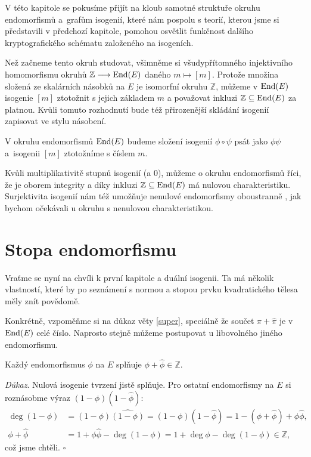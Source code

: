 \documentclass[12pt]{report}
\begin{document}
V této kapitole se pokusíme přijít na kloub samotné struktuře okruhu endomorfismů a~grafům isogenií, které nám pospolu s teorií, kterou jsme si představili v předchozí kapitole, pomohou osvětlit funkčnost dalšího kryptografického schématu založeného na isogeních.

Než začneme tento okruh studovat, všimněme si všudypřítomného injektivního homomorfismu okruhů $\mathbb{Z} \longrightarrow \operatorname{End}(E)$ daného $m \mapsto [m]$. Protože množina složená ze skalárních násobků na $E$ je isomorfní okruhu $\mathbb{Z}$, můžeme v $\operatorname{End}(E)$ isogenie $[m]$ ztotožnit s jejich základem $m$ a považovat inkluzi $\mathbb{Z} \subseteq \operatorname{End}(E)$ za platnou. Kvůli tomuto rozhodnutí bude též přirozenější skládání isogenií zapisovat ve stylu násobení.

\begin{umluva}
V okruhu endomorfismů $\operatorname{End}(E)$ budeme složení isogenií $\phi \circ \psi$ psát jako $\phi \psi$ a~isogenii $[m]$ ztotožníme s číslem $m$.
\end{umluva}


Kvůli multiplikativitě stupnů isogenií (a $0$), můžeme o okruhu endomorfismů říci, že je oborem integrity a díky inkluzi $\mathbb{Z} \subseteq \operatorname{End}(E)$ má nulovou charakteristiku. Surjektivita isogenií nám též umožňuje nenulové endomorfismy oboustranně , jak bychom očekávali u okruhu s nenulovou charakteristikou.

\section{Stopa endomorfismu}

Vraťme se nyní na chvíli k první kapitole a duální isogenii. Ta má několik vlastností, které by po seznámení s normou a stopou prvku kvadratického tělesa měly znít povědomě.

Konkrétně, vzpoměňme si na důkaz věty \ref{super}, speciálně že součet $\pi+\widehat{\pi}$ je v $\operatorname{End}(E)$ celé číslo. Naprosto stejně můžeme postupovat u libovolného jiného endomorfismu.
\begin{veta}
Každý endomorfismus $\phi$ na $E$ splňuje $\phi+\widehat{\phi} \in \mathbb{Z}$.
\end{veta}
\noindent \textit{Důkaz}.  Nulová isogenie tvrzení jistě splňuje. Pro ostatní endomorfismy na $E$ si roznásobme výraz $(1 - \phi)(1 - \widehat{\phi})$:
\begin{align*}
\deg (1-\phi) &= (1-\phi)\widehat{(1-\phi)} = (1-\phi)(1-\widehat{\phi}) = 1-(\phi+\widehat{\phi})+\phi \widehat{\phi},\\
\phi+\widehat{\phi} &= 1 + \phi \widehat{\phi} - \deg (1-\phi) = 1 + \deg \phi - \deg (1-\phi) \in \mathbb{Z},
\end{align*}
což jsme chtěli. \hfill $\square$\\
\end{document}
